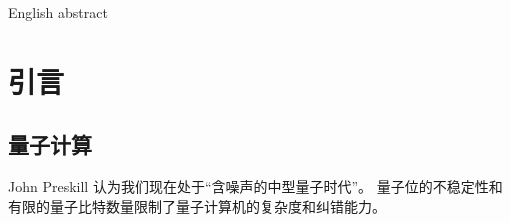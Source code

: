 \documentclass[
  ]{njuthesis}
\begin{document}

\maketitle

\raggedbottom

\begin{abstract}
  中文摘要
\end{abstract}

\begin{abstract*}
  English abstract
\end{abstract*}

\tableofcontents

\mainmatter


%   
%   

\chapter{引言}

\section{量子计算}

John Preskill 认为我们现在处于“含噪声的中型量子时代”。\cite{preskill2018}
量子位的不稳定性和有限的量子比特数量限制了量子计算机的复杂度和纠错能力。
\end{document}

